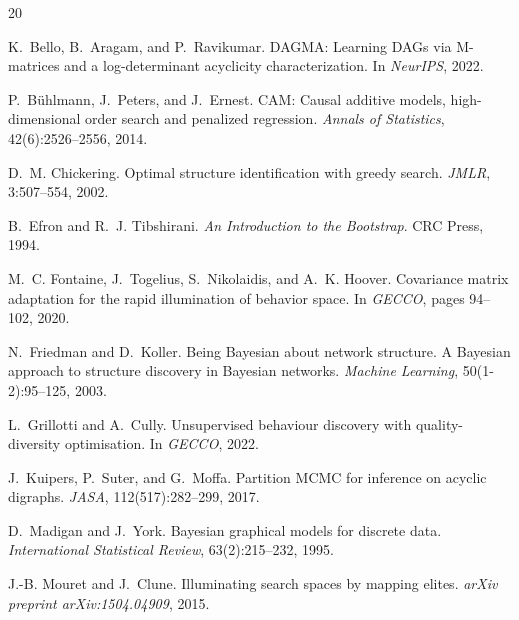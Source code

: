 \documentclass[11pt,a4paper]{article}
\begin{document}
\begin{thebibliography}{20}

K.~Bello, B.~Aragam, and P.~Ravikumar.
\newblock DAGMA: Learning DAGs via M-matrices and a log-determinant acyclicity characterization.
\newblock In \emph{NeurIPS}, 2022.

P.~B{\"u}hlmann, J.~Peters, and J.~Ernest.
\newblock CAM: Causal additive models, high-dimensional order search and penalized regression.
\newblock \emph{Annals of Statistics}, 42(6):2526--2556, 2014.

D.~M. Chickering.
\newblock Optimal structure identification with greedy search.
\newblock \emph{JMLR}, 3:507--554, 2002.

B.~Efron and R.~J. Tibshirani.
\newblock \emph{An Introduction to the Bootstrap}.
\newblock CRC Press, 1994.

M.~C. Fontaine, J.~Togelius, S.~Nikolaidis, and A.~K. Hoover.
\newblock Covariance matrix adaptation for the rapid illumination of behavior space.
\newblock In \emph{GECCO}, pages 94--102, 2020.

N.~Friedman and D.~Koller.
\newblock Being Bayesian about network structure. A Bayesian approach to structure discovery in Bayesian networks.
\newblock \emph{Machine Learning}, 50(1-2):95--125, 2003.

L.~Grillotti and A.~Cully.
\newblock Unsupervised behaviour discovery with quality-diversity optimisation.
\newblock In \emph{GECCO}, 2022.

J.~Kuipers, P.~Suter, and G.~Moffa.
\newblock Partition MCMC for inference on acyclic digraphs.
\newblock \emph{JASA}, 112(517):282--299, 2017.

D.~Madigan and J.~York.
\newblock Bayesian graphical models for discrete data.
\newblock \emph{International Statistical Review}, 63(2):215--232, 1995.

J.-B. Mouret and J.~Clune.
\newblock Illuminating search spaces by mapping elites.
\newblock \emph{arXiv preprint arXiv:1504.04909}, 2015.


\end{thebibliography}
\end{document}
